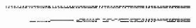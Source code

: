 \documentclass[10pt]{article}
\theoremstyle{plain}
\theoremstyle{definition}
\begin{document}
\begin{table*}[b]
{\begin{minipage}{5.32in}
\[\begin{array}{@{}r@{}}
\begin{array}{@{}l@{}}
\a\a\a\b\a\a\a\b\a\a\b\b\a\a\b\b\a\a\a\b\a\a\a\b\a\a\b\b\a\a\b\b\a\b\a\b \a\b\a\b\a\b\b\b\a\b\b\b\a\b\a\b\a\b\a\b\a\b\b\b\a\b\b\b\a\a\a\b\a\a\a\b \a\a\b\b\a\a\b\b\a\a\a\b\a\a\a\b\a\a\b\b\a\a\b\b\a\b\a\b\a\b\a\b\a\b\b\b \a\b\b\b\a\b\a\b\a\b\a\b\a\b\b\b\a\b\b\b\b\a\a\b\b\a\a\b\b\a\b\b\b\a\b\b \b\a\a\b\b\a\a\b\b\a\b\b\b\a\b\b\b\b\a\b\b\b\a\b\b\b\b\b\b\b\b\b\b\b\a\b \b\b\a\b\b\b\b\b\b\b\b\b\b\a\a\b\b\a\a\b\b\a\b\b\b\a\b\b\b\a\a\b\b\a\a\b \b\a\b\b\b\a\b\b\b\b\a\b\b\b\a\b\b\b\b\b\b\b\b\b\b\b\a\b\b\b\a\b\b\b\b\b \b\b\b\b\mynl
\a\a\a\b\a\a\b\b\a\a\a\b\a\a\b\b\a\b\a\b\a\b\b\b\a\b\a\b\a\b\b\b\a\a\a\b \a\a\b\b\a\a\a\b\a\a\b\b\a\b\a\b\a\b\b\b\a\b\a\b\a\b\b\b\b\a\a\b\b\a\b\b \b\a\a\b\b\a\b\b\b\b\a\b\b\b\b\b\b\b\a\b\b\b\b\b\b\a\a\b\b\a\b\b\b\a\a\b \b\a\b\b\b\b\a\b\b\b\b\b\b\b\a\b\b\b\b\b\a\a\a\b\a\a\b\b\a\a\a\b\a\a\b\b \a\b\a\b\a\b\b\b\a\b\a\b\a\b\b\b\a\a\a\b\a\a\b\b\a\a\a\b\a\a\b\b\a\b\a\b \a\b\b\b\a\b\a\b\a\b\b\b\b\a\a\b\b\a\b\b\b\a\a\b\b\a\b\b\b\b\a\b\b\b\b\b \b\b\a\b\b\b\b\b\b\a\a\b\b\a\b\b\b\a\a\b\b\a\b\b\b\b\a\b\b\b\b\b\b\b\a\b \b\b\b\b
\end{array}
\mynnl
\begin{array}{@{}l@{}}
\a\a\a\a\a\a\a\a\a\a\a\a\a\a\a\a\a\a\a\a\a\a\a\a\a\a\a\a\a\a\a\a\a\a\a\a \a\a\a\a\a\a\a\a\a\a\a\a\a\a\a\a\a\a\a\a\a\a\a\a\a\a\a\a\a\a\a\a\a\a\a\a \a\a\a\a\a\a\a\a\a\a\a\a\a\a\a\a\a\a\a\a\a\a\a\a\a\a\a\a\a\a\a\a\b\b\b\b \b\b\b\b\a\a\b\b\a\a\b\b\a\a\b\b\a\a\b\b\b\b\b\b\a\a\a\a\b\b\b\b\a\a\b\b \b\b\b\b\a\a\a\a\b\b\b\b\a\a\b\b\b\b\b\b\b\b\b\b\b\b\b\b\a\a\b\b\b\b\b\b \b\b\b\b\b\b\b\b\a\a\b\b\b\a\a\b\b\a\a\b\b\a\b\b\b\a\b\b\b\a\a\b\b\a\a\b \b\a\b\b\b\a\b\b\b\b\a\b\b\b\a\b\b\b\b\b\b\b\b\b\b\b\a\b\b\b\a\b\b\b\b\b \b\b\b\b\mynl
\a\a\a\a\a\a\a\a\a\a\a\a\a\a\a\a\a\a\a\a\a\a\a\a\a\a\a\a\a\a\a\a\a\a\a\a \a\a\a\a\a\a\a\a\a\a\a\a\a\a\a\a\a\a\a\a\a\a\a\a\a\a\a\a\b\b\b\b\b\b\b\b \b\b\b\b\b\b\b\b\b\b\b\b\b\b\b\b\b\b\b\b\b\b\b\b\a\a\a\a\b\b\b\b\a\a\a\a \b\b\b\b\a\b\a\b\a\b\a\b\a\b\a\b\a\b\a\b\a\a\a\a\a\a\a\a\a\a\a\a\a\b\a\b \a\a\a\a\b\b\b\b\a\a\a\a\a\b\a\b\a\a\a\a\a\a\a\a\a\a\a\a\a\b\a\b\a\a\a\a \b\b\b\b\a\a\a\a\a\b\a\b\b\a\a\b\b\a\b\b\b\a\a\b\b\a\b\b\b\b\a\b\b\b\b\b \b\b\a\b\b\b\b\b\b\a\a\b\b\a\b\b\b\a\a\b\b\a\b\b\b\b\a\b\b\b\b\b\b\b\a\b \b\b\b\b\mynl
\a\a\a\a\a\a\a\a\a\a\a\a\a\a\a\a\a\a\a\a\a\a\a\a\a\a\a\a\a\a\a\a\a\a\a\a \b\b\b\b\b\b\b\b\a\a\b\b\a\b\a\b\a\b\a\b\a\b\b\b\a\b\b\b\a\a\a\a\a\a\a\a \a\a\a\a\a\a\a\a\a\a\a\a\a\a\a\a\a\a\a\a\a\a\a\a\a\a\a\a\b\b\b\b\b\b\b\b \a\a\b\b\a\b\a\b\a\b\a\b\a\b\b\b\a\b\b\b\a\a\a\a\a\a\a\a\b\b\b\b\b\b\b\b \a\a\a\a\a\a\a\a\a\a\a\a\a\a\a\a\b\b\b\b\b\b\b\b\b\b\b\b\a\a\b\b\b\b\a\b \b\b\a\b\b\b\b\b\b\b\b\b\a\a\b\b\a\a\b\b\a\a\b\b\a\a\b\b\a\a\a\a\a\a\a\a \a\a\a\a\a\a\a\a\b\b\b\b\b\b\b\b\b\b\b\b\a\a\b\b\b\b\a\b\b\b\a\b\b\b\b\b \b\b\b\b\mynl

\end{array}
\end{array}\]
\end{minipage}}
\end{table*}
\end{document}
